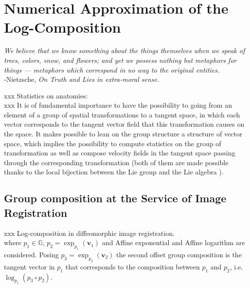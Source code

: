 \chapter{Numerical Approximation of the Log-Composition}\label{ch:application_log_composition}

\begin{flushright}
	\emph{We believe that we know something about the things themselves when we speak of trees, colors, snow, and flowers; and yet we possess nothing but metaphors for things — metaphors which correspond in no way to the original entities.} \\ -Nietzsche, \emph{On Truth and Lies in extra-moral sense.}
\end{flushright}


xxx Statistics on anatomies: \\
xxx It is of fundamental importance to have the possibility to going from an element of a group of spatial transformations  to a tangent space, in which each vector corresponds to the tangent vector field that this transformation causes on the space. It makes possible to lean on the group structure a structure of vector space, which implies the possibility to compute statistics on the group of transformation as well as compose velocity fields in the tangent space passing through the corresponding transformation (both of them are made possible thanks to the local bijection between the Lie group and the Lie algebra ). \\

\section{Group composition at the Service of Image Registration}

xxx Log-composition in diffeomorphic image registration.\\


where $p_1 \in \mathbb{G}$, $p_2 = \exp_{p_1}(\mathbf{v}_{1})$ and Affine exponential and Affine logarithm are considered. Posing $p_3 = \exp_{p_2}(\mathbf{v}_{2})$ the second offset group composition is the tangent vector in $p_1$ that corresponds to the composition between $p_1$ and $p_2$, i.e. $\log_{p_1}(p_3 \circ p_2)$. \\

